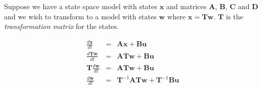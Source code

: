 Suppose we have a state space model with states $\mathbf{x}$ and matrices $\mathbf{A}$, $\mathbf{B}$, $\mathbf{C}$ and $\mathbf{D}$ and we wish to transform to a model with states $\mathbf{w}$ where $\mathbf{x}=\mathbf{Tw}$. $\mathbf{T}$ is the \emph{transformation matrix} for the states.

\begin{eqnarray*}
	\frac{d\mathbf{x}}{dt} & = & \mathbf{A}\mathbf{x}+\mathbf{B}\mathbf{u} \\
	\frac{d\mathbf{Tw}}{dt} & = & \mathbf{ATw}+\mathbf{B}\mathbf{u} \\
	\mathbf{T}\frac{d\mathbf{w}}{dt} & = & \mathbf{ATw}+\mathbf{B}\mathbf{u} \\
	\frac{d\mathbf{w}}{dt} & = & \mathbf{T}^{-1}\mathbf{ATw}+\mathbf{T}^{-1}\mathbf{B}\mathbf{u} \\	
\end{eqnarray*}

\endinput

